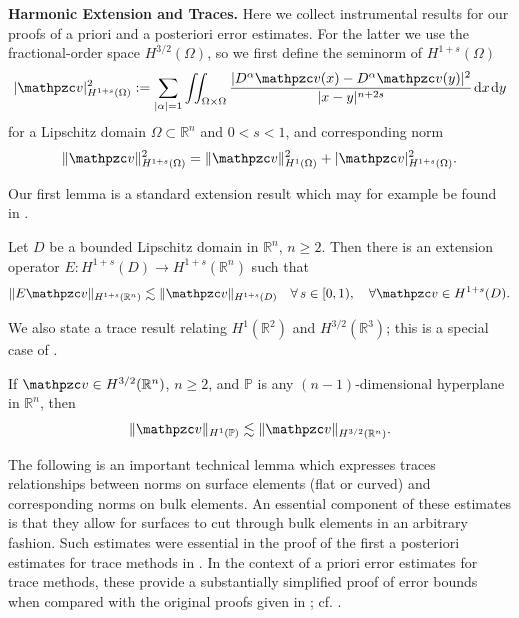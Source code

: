   
\medskip\noindent
{\bf Harmonic Extension and Traces.}
Here we collect instrumental results for our proofs of a priori and a posteriori error estimates. For the latter we use the fractional-order space $H^{3/2}(\Omega)$, so we first define the seminorm of $H^{1+s}(\Omega)$
%
  $$|\tv|_{H^{1+s}(\Omega)}^2 := \sum_{|\alpha|=1} \iint_{\Omega \times \Omega} \frac{|D^\alpha \tv(x)-D^\alpha \tv(y)|^2}{|x-y|^{n+2s}} \hspace{1pt} {\rm d}x \hspace{1pt}{\rm d}y$$
%
for a Lipschitz domain $\Omega\subset\mathbb{R}^n$ and $0<s<1$, and corresponding norm
$$\|\tv\|_{H^{1+s}(\Omega)}^2 =\|\tv\|_{H^1(\Omega)}^2 + |\tv|_{H^{1+s}(\Omega)}^2.$$

Our first lemma is a standard extension result which may for example be found in \cite[Theorem 1.4.3.1]{G85}.  

\begin{lemma}[$H^{1+s}$ extension]
\label{lem:standard_extension}
Let $D$ be a bounded Lipschitz domain in $\mathbb{R}^n$, $n\ge2$.  Then there is an extension operator $E: H^{1+s}(D) \rightarrow H^{1+s}(\mathbb{R}^n)$ such that 
\begin{align}
\label{extension}
\|E\tv\|_{H^{1+s}(\mathbb{R}^n)} \lesssim \|\tv\|_{H^{1+s}(D)} \quad \forall \,s\in [0,1), \quad \forall \tv \in H^{1+s}(D).
\end{align}
\end{lemma}

We also state a trace result relating $H^1(\mathbb{R}^2)$ and $H^{3/2}(\mathbb{R}^3)$; this is a special case of \cite[Theorem 7.58]{Ad75}.   
\begin{lemma}[trace]
\label{lem:special_trace}
If $\tv \in H^{3/2}(\mathbb{R}^n)$, $n\ge2$, and $\mathbb{P}$ is any $(n-1)$-dimensional hyperplane in $\mathbb{R}^n$, then
\begin{align}
\label{special_trace}
\|\tv\|_{H^1(\mathbb{P})}  \lesssim \|\tv\|_{H^{3/2}(\mathbb{R}^n)}.
\end{align}
\end{lemma}

The following is an important technical lemma which expresses traces relationships between norms on surface elements (flat or curved) and corresponding norms on bulk elements.  An essential component of these estimates is that they allow for surfaces to cut through bulk elements in an arbitrary fashion.   Such estimates were essential in the proof of the first a posteriori estimates for trace methods in \cite{DO12}.  In the context of a priori error estimates for trace methods, these provide a substantially simplified proof of error bounds when compared with the original proofs given in \cite{ORG09}; cf. \cite{HH02, HH04, BHL15, Re15}.  


